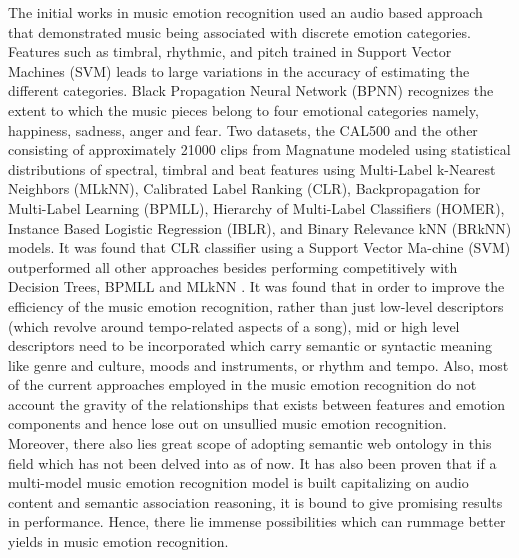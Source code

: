 \documentclass{proc}
\begin{document}
The initial works in music emotion recognition used an audio based approach that demonstrated music being associated with discrete emotion categories. Features such as timbral, rhythmic, and pitch trained in Support Vector Machines (SVM) leads to large variations in the accuracy of estimating the different categories. Black Propagation Neural Network (BPNN) recognizes the extent to which the music pieces belong to four emotional categories namely, happiness, sadness, anger and fear. Two datasets, the CAL500 and the other consisting of approximately 21000 clips from Magnatune modeled using statistical distributions of spectral, timbral and beat features using Multi-Label k-Nearest Neighbors (MLkNN), Calibrated Label Ranking (CLR), Backpropagation for Multi-Label Learning (BPMLL), Hierarchy of Multi-Label Classifiers (HOMER), Instance Based Logistic Regression (IBLR), and Binary Relevance kNN (BRkNN) models. It was found that CLR classifier using a Support Vector Ma-chine (SVM) outperformed all other approaches besides performing competitively with Decision Trees, BPMLL and MLkNN \cite{Barthet2012}. It was found that in order to improve the efficiency of the music emotion recognition, rather than just low-level descriptors (which revolve around tempo-related aspects of a song), mid or high level descriptors need to be incorporated which carry semantic or syntactic meaning like genre and culture, moods and instruments, or rhythm and tempo. Also, most of the current approaches employed in the music emotion recognition do not account the gravity of the relationships that exists between features and emotion components and hence lose out on unsullied music emotion recognition. Moreover, there also lies great scope of adopting semantic web ontology in this field which has not been delved into as of now. It has also been proven that if a multi-model music emotion recognition model is built capitalizing on audio content and semantic association reasoning, it is bound to give promising results in performance. Hence, there lie immense possibilities which can rummage better yields in music emotion recognition.
\end{document}
